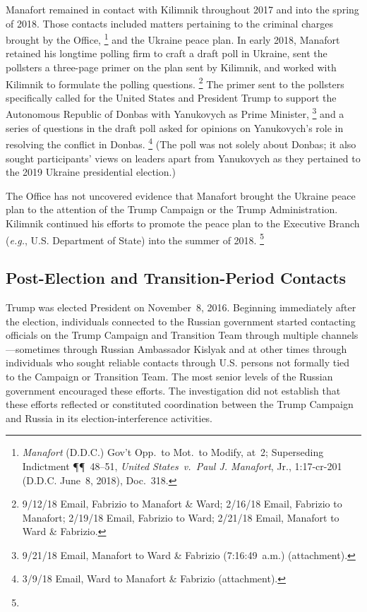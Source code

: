 Manafort remained in contact with Kilimnik throughout 2017 and into the spring of 2018.
Those contacts included matters pertaining to the criminal charges brought by the Office,%
\footnote{\textit{Manafort} (D.D.C.) Gov't Opp.\ to Mot.\ to Modify, at~2;
Superseding Indictment \P\P~48--51, \textit{United States~v.\ Paul J. Manafort}, Jr., 1:17-cr-201 (D.D.C. June~8, 2018), Doc.~318.}
and the Ukraine peace plan.
In early 2018, Manafort retained his longtime polling firm to craft a draft poll in Ukraine, sent the pollsters a three-page primer on the plan sent by Kilimnik, and worked with Kilimnik to formulate the polling questions.%
\footnote{9/12/18 Email, Fabrizio to Manafort \& Ward;
2/16/18 Email, Fabrizio to Manafort;
2/19/18 Email, Fabrizio to Ward;
2/21/18 Email, Manafort to Ward \& Fabrizio.}
The primer sent to the pollsters specifically called for the United States and President Trump to support the Autonomous Republic of Donbas with Yanukovych as Prime Minister,%
\footnote{9/21/18 Email, Manafort to Ward \& Fabrizio (7:16:49~a.m.) (attachment).}
and a series of questions in the draft poll asked for opinions on Yanukovych's role in resolving the conflict in Donbas.%
\footnote{3/9/18 Email, Ward to Manafort \& Fabrizio (attachment).}
(The poll was not solely about Donbas; it also sought participants' views on leaders apart from Yanukovych as they pertained to the 2019 Ukraine presidential election.)

The Office has not uncovered evidence that Manafort brought the Ukraine peace plan to the attention of the Trump Campaign or the Trump Administration.
Kilimnik continued his efforts to promote the peace plan to the Executive Branch (\textit{e.g.}, U.S. Department of State) into the summer of 2018.%
\footnote{}

\subsection{Post-Election and Transition-Period Contacts}

Trump was elected President on November~8, 2016.
Beginning immediately after the election, individuals connected to the Russian government started contacting officials on the Trump Campaign and Transition Team through multiple channels---sometimes through Russian Ambassador Kislyak and at other times through individuals who sought reliable contacts through U.S. persons not formally tied to the Campaign or Transition Team.
The most senior levels of the Russian government encouraged these efforts.
The investigation did not establish that these efforts reflected or constituted coordination between the Trump Campaign and Russia in its election-interference activities.

